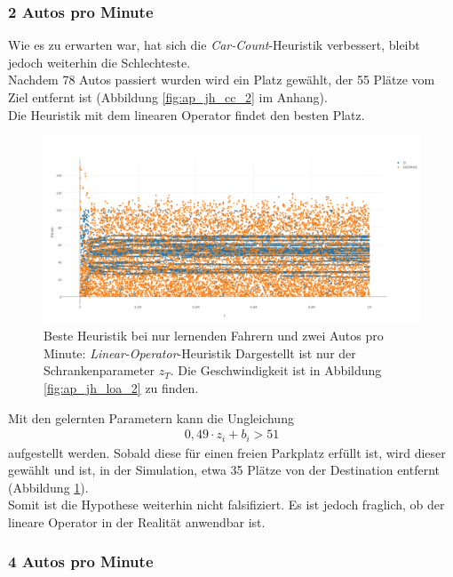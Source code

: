 \subsubsection{2 Autos pro Minute}

Wie es zu erwarten war, hat sich die \emph{Car-Count}-Heuristik verbessert, bleibt jedoch weiterhin die Schlechteste.\\
Nachdem 78 Autos passiert wurden wird ein Platz gewählt, der 55 Plätze vom Ziel entfernt ist (Abbildung \ref{fig:ap_jh_cc_2} im Anhang).\\
Die Heuristik mit dem linearen Operator findet den besten Platz. 
\begin{figure}
	\includegraphics[width=\textwidth]{analyse/JustHeuristik/2pm/linop.png}
	\caption{Beste Heuristik bei nur lernenden Fahrern und zwei Autos pro Minute: \emph{Linear-Operator}-Heuristik Dargestellt ist nur der Schrankenparameter $z_T$. Die Geschwindigkeit ist in Abbildung \ref{fig:ap_jh_loa_2} zu finden.} \label{fig:res_jh_2pm_best}
\end{figure}
Mit den gelernten Parametern kann die Ungleichung 
\begin{align}
0,49\cdot z_i+b_i > 51
\end{align} aufgestellt werden. Sobald diese für einen freien Parkplatz erfüllt ist, wird dieser gewählt und ist, in der Simulation, etwa 35 Plätze von der Destination entfernt (Abbildung \ref{fig:res_jh_2pm_best}).\\
Somit ist die Hypothese weiterhin nicht falsifiziert. Es ist jedoch fraglich, ob der lineare Operator in der Realität anwendbar ist. \\

\subsubsection{4 Autos pro Minute}


